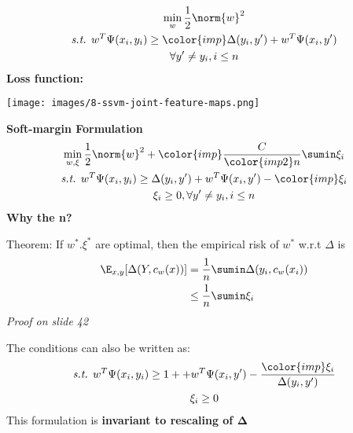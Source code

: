 \begin{equation*}
	\begin{gathered}
		\min_w \frac{1}{2} \norm{w}^2 \\
		\textit{s.t. } w^T\Psi(x_i, y_i) \geq {\color{imp}\Delta(y_i, y')} + w^T\Psi(x_i, y') \\
		\forall y'\neq y_i, i\leq n
	\end{gathered}
\end{equation*}
\textbf{Loss function: }
\begin{center}
	\texttt{[image: images/8-ssvm-joint-feature-maps.png]}
\end{center}

\textbf{Soft-margin Formulation}
\begin{equation*}
	\begin{gathered}
		\min_{w,\xi} \frac{1}{2} \norm{w}^2 + {\color{imp} \frac{C}{{\color{imp2}n}}\sumin \xi_i} \\
		\textit{s.t. }  w^T\Psi(x_i, y_i) \geq \Delta(y_i, y') + w^T\Psi(x_i, y') - {\color{imp} \xi_i} \\
		\xi_i \geq 0, \forall y'\neq y_i, i\leq n
	\end{gathered}
\end{equation*}
\textbf{Why the {\color{imp2}n}?}

Theorem: If $w^*. \xi^*$ are optimal, then the empirical risk of $w^*$ w.r.t $\Delta$ is 
\begin{align*}
	\E_{x,y}[\Delta (Y, c_w(x))] 	&= \frac{1}{n}\sumin\Delta(y_i, c_w(x_i)) \\
									&\leq \frac{1}{n} \sumin\xi_i
\end{align*} 
\textit{Proof on slide 42}

The conditions can also be written as: 
\begin{equation*}
	\begin{gathered}
		\textit{s.t. }  w^T\Psi(x_i, y_i) \geq 1 + + w^T\Psi(x_i, y') - \frac{{\color{imp} \xi_i}}{\Delta(y_i, y')} \\
		\xi_i \geq 0
	\end{gathered}
\end{equation*}
This formulation is \textbf{invariant to rescaling of $\mathbf \Delta$}




